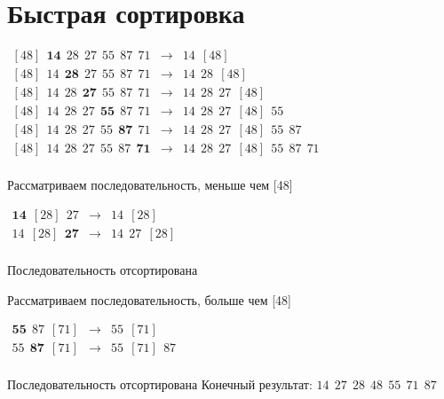 \documentclass{article}
\begin{document}
\section*{Быстрая сортировка}
$\begin{array}{rcl}
        {[48]} ~~ \textbf{14} ~~ 28 ~~ 27 ~~ 55 ~~ 87 ~~ 71 & \rightarrow & 14 ~~ {[48]}                               \\
        {[48]} ~~ 14 ~~ \textbf{28} ~~ 27 ~~ 55 ~~ 87 ~~ 71 & \rightarrow & 14 ~~ 28 ~~ {[48]}                         \\
        {[48]} ~~ 14 ~~ 28 ~~ \textbf{27} ~~ 55 ~~ 87 ~~ 71 & \rightarrow & 14 ~~ 28 ~~ 27 ~~ {[48]}                   \\
        {[48]} ~~ 14 ~~ 28 ~~ 27 ~~ \textbf{55} ~~ 87 ~~ 71 & \rightarrow & 14 ~~ 28 ~~ 27 ~~ {[48]} ~~ 55             \\
        {[48]} ~~ 14 ~~ 28 ~~ 27 ~~ 55 ~~ \textbf{87} ~~ 71 & \rightarrow & 14 ~~ 28 ~~ 27 ~~ {[48]} ~~ 55 ~~ 87       \\
        {[48]} ~~ 14 ~~ 28 ~~ 27 ~~ 55 ~~ 87 ~~ \textbf{71} & \rightarrow & 14 ~~ 28 ~~ 27 ~~ {[48]} ~~ 55 ~~ 87 ~~ 71 \\
    \end{array}$

Рассматриваем последовательность, меньше чем [48]

$\begin{array}{rcl}
        \textbf{14} ~~ {[28]} ~~ 27 & \rightarrow & 14 ~~ {[28]}       \\
        14 ~~ {[28]} ~~ \textbf{27} & \rightarrow & 14 ~~ 27 ~~ {[28]} \\
    \end{array}$

Последовательность отсортирована

Рассматриваем последовательность, больше чем [48]

$\begin{array}{rcl}
        \textbf{55} ~~ 87 ~~ {[71]} & \rightarrow & 55 ~~ {[71]}       \\
        55 ~~ \textbf{87} ~~ {[71]} & \rightarrow & 55 ~~ {[71]} ~~ 87 \\
    \end{array}$

Последовательность отсортирована \newline
Конечный результат: \newline
$14 ~~ 27 ~~ 28 ~~ 48 ~~ 55 ~~ 71 ~~ 87$
\end{document}
